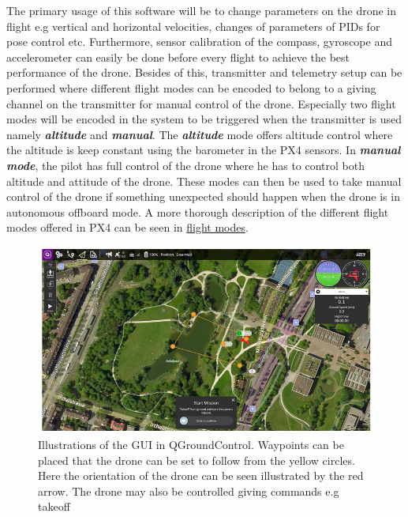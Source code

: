 \documentclass[../Head/report.tex]{subfiles}
\begin{document}
The primary usage of this software will be to change parameters on the drone in flight e.g vertical and horizontal velocities, changes of parameters of PIDs for pose control etc. Furthermore, sensor calibration of the compass, gyroscope and accelerometer can easily be done before every flight to achieve the best performance of the drone. Besides of this, transmitter and telemetry setup can be performed where different flight modes can be encoded to belong to a giving channel on the transmitter for manual control of the drone. Especially two flight modes will be encoded in the system to be triggered when the transmitter is used namely \textit{\textbf{altitude}} and \textit{\textbf{manual}}. The \textit{\textbf{altitude}} mode offers altitude control where the altitude is keep constant using the barometer in the PX4 sensors. In \textit{\textbf{manual mode}}, the pilot has full control of the drone where he has to control both altitude and attitude of the drone. These modes can then be used to take manual control of the drone if something unexpected should happen when the drone is in autonomous offboard mode. A more thorough description of the different flight modes offered in PX4 can be seen in \href{https://docs.px4.io/v1.9.0/en/flight_modes/}{flight modes}.

\begin{figure}[H]
    \centering
    \includegraphics[width=0.7\linewidth]{../Figures/qgroundcontrol.png}
    \caption{Illustrations of the GUI in QGroundControl. Waypoints can be placed that the drone can be set to follow from the yellow circles. Here the orientation of the drone can be seen illustrated by the red arrow. The drone may also be controlled giving commands e.g takeoff}
    \label{fig:qgroundcontrol}
\end{figure}
\end{document}
